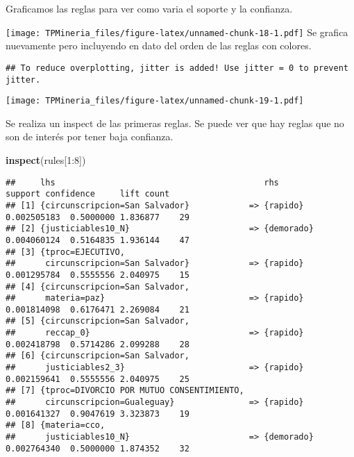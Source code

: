 \documentclass[runningheads,a4paper]{llncs}
\newenvironment{Shaded}{}{}
\newcommand{\KeywordTok}[1]{\textcolor[rgb]{0.00,0.44,0.13}{\textbf{{#1}}}}
\newcommand{\DecValTok}[1]{\textcolor[rgb]{0.25,0.63,0.44}{{#1}}}
\newcommand{\NormalTok}[1]{{#1}}
\newcommand{\OperatorTok}[1]{\textcolor[rgb]{0.40,0.40,0.40}{{#1}}}
\begin{document}
Graficamos las reglas para ver como varia el soporte y la confianza.

\texttt{[image: TPMineria\_files/figure-latex/unnamed-chunk-18-1.pdf]} Se
grafica nuevamente pero incluyendo en dato del orden de las reglas con
colores.

\begin{verbatim}
## To reduce overplotting, jitter is added! Use jitter = 0 to prevent jitter.
\end{verbatim}

\texttt{[image: TPMineria\_files/figure-latex/unnamed-chunk-19-1.pdf]}

Se realiza un inspect de las primeras reglas. Se puede ver que hay
reglas que no son de interés por tener baja confianza.

\begin{Shaded}
\begin{Highlighting}[]
\KeywordTok{inspect}\NormalTok{(rules[}\DecValTok{1}\OperatorTok{:}\DecValTok{8}\NormalTok{])}
\end{Highlighting}
\end{Shaded}

\begin{verbatim}
##     lhs                                          rhs            support confidence     lift count
## [1] {circunscripcion=San Salvador}            => {rapido}   0.002505183  0.5000000 1.836877    29
## [2] {justiciables10_N}                        => {demorado} 0.004060124  0.5164835 1.936144    47
## [3] {tproc=EJECUTIVO,                                                                            
##      circunscripcion=San Salvador}            => {rapido}   0.001295784  0.5555556 2.040975    15
## [4] {circunscripcion=San Salvador,                                                               
##      materia=paz}                             => {rapido}   0.001814098  0.6176471 2.269084    21
## [5] {circunscripcion=San Salvador,                                                               
##      reccap_0}                                => {rapido}   0.002418798  0.5714286 2.099288    28
## [6] {circunscripcion=San Salvador,                                                               
##      justiciables2_3}                         => {rapido}   0.002159641  0.5555556 2.040975    25
## [7] {tproc=DIVORCIO POR MUTUO CONSENTIMIENTO,                                                    
##      circunscripcion=Gualeguay}               => {rapido}   0.001641327  0.9047619 3.323873    19
## [8] {materia=cco,                                                                                
##      justiciables10_N}                        => {demorado} 0.002764340  0.5000000 1.874352    32
\end{verbatim}
\end{document}
